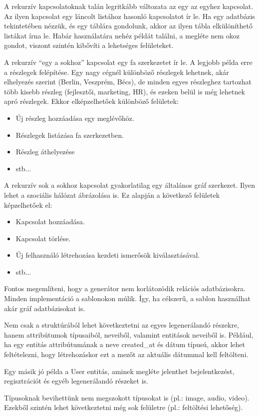 \documentclass[a4paper,12pt,oneside]{report}
\begin{document}
\begin{justify}
	A rekurzív kapcsolatoknak talán legritkább változata az egy az egyhez kapcsolat. Az ilyen kapcsolat egy láncolt listához hasonló kapcsolatot ír le. Ha egy adatbázis tekintetében nézzük, és egy táblára gondolunk, akkor az ilyen tábla elkülöníthető listákat írna le. Habár használatára nehéz példát találni, a megléte nem okoz gondot, viszont szintén kibővíti a lehetséges felületeket. 

	A rekurzív “egy a sokhoz” kapcsolat egy fa szerkezetet ír le. A legjobb példa erre a részlegek felépítése. Egy nagy cégnél különböző részlegek lehetnek, akár elhelyezés szerint (Berlin, Veszprém, Bécs), de minden egyes részleghez tartozhat több kisebb részleg (fejlesztői, marketing, HR), és ezeken belül is még lehetnek apró részlegek. Ekkor elképzelhetőek különböző felületek: 

	\begin{itemize}
		\item Új részleg hozzáadása egy meglévőhöz. 
		\item Részlegek listázása fa szerkezetben. 
		\item Részleg áthelyezése
		\item stb...
	\end{itemize}

    A rekurzív sok a sokhoz kapcsolat gyakorlatilag egy általános gráf szerkezet. Ilyen lehet a szociális hálózat ábrázolása is. Ez alapján a következő felületek képzelhetőek el: 
    \begin{itemize}
		\item Kapcsolat hozzáadása. 
		\item Kapcsolat törlése.
		\item Új felhasználó létrehozása kezdeti ismerősök kiválasztásával.
		\item stb...
	\end{itemize}

	Fontos megemlíteni, hogy a generátor nem korlátozódik relációs adatbázisokra. Minden implementáció a sablonokon múlik. Így, ha célszerű, a sablon használhat akár gráf adatbázisokat is.   

	Nem csak a struktúrából lehet következtetni az egyes legenerálandó részekre, hanem attribútumok típusaiból, neveiből, valamint entitások neveiből is. Például, ha egy entitás attribútumának a neve created\_at és dátum típusú, akkor lehet feltételezni, hogy létrehozáskor ezt a mezőt az aktuális dátummal kell feltölteni. 

	Egy másik jó példa a User entitás, aminek megléte jelenthet bejelentkezést, regisztrációt és egyéb legenerálandó részeket is.

	Típusoknak bevihettünk nem megszokott típusokat is (pl.: image, audio, video). Ezekből szintén lehet következtetni még sok felületre (pl.: feltöltési lehetőség).

\end{justify}
\end{document}
